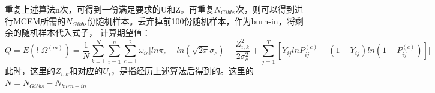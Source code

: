 \documentclass[11pt]{article}
\begin{document}
重复上述算法n次，可得到一份满足要求的U和Z。再重复$N_{Gibbs}$次，则可以得到进行MCEM所需的$N_{Gibbs}$份随机样本。丢弃掉前100份随机样本，作为burn-in，将剩余的随机样本代入式子，
计算期望值：
$$Q=E(l|\Omega^{(m)})=\frac{1}{N}\sum_{k=1}^{N} \sum_{i=1}^n\sum_{c=1}^2\omega_{ic}\Big[ln\pi_c-ln(\sqrt{2\pi}\sigma_c)-\frac{Z_{i,k}^2}{2\sigma_c^2}+\sum_{j=1}^T[Y_{ij}lnP^{(c)}_{ij}+(1-Y_{ij})ln(1-P^{(c)}_{ij})]\Big]$$
此时，这里的$Z_{i,k}$和对应的$U_i$，是指经历上述算法后得到的。这里的$N=N_{Gibbs}-N_{burn-in}$




\end{document}
